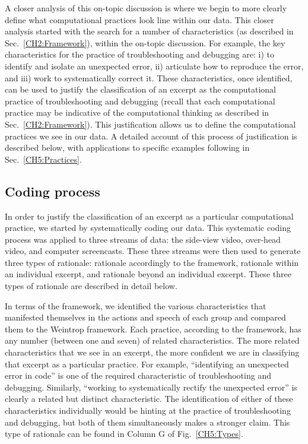 \documentclass{msuphddissertation}
\begin{document}
\begin{doublespace}
A closer analysis of this on-topic discussion is where we begin to more clearly define what computational practices look line within our data.  This closer analysis started with the search for a number of characteristics (as described in Sec.~\ref{CH2:Framework}), within the on-topic discussion.  For example, the key characteristics for the practice of troubleshooting and debugging are: i) to identify and isolate an unexpected error, ii) articulate how to reproduce the error, and iii) work to systematically correct it.  These characteristics, once identified, can be used to justify the classification of an excerpt as the computational practice of troubleshooting and debugging (recall that each computational practice may be indicative of the computational thinking as described in Sec.~\ref{CH2:Framework}).  This justification allows us to define the computational practices we see in our data.  A detailed account of this process of justification is described below, with applications to specific examples following in Sec.~\ref{CH5:Practices}.

\subsection{Coding process}\label{CH5:CodingProcess}

In order to justify the classification of an excerpt as a particular computational practice, we started by systematically coding our data.  This systematic coding process was applied to three streams of data: the side-view video, over-head video, and computer screencasts.  These three streams were then used to generate three types of rationale: rationale accordingly to the framework, rationale within an individual excerpt, and rationale beyond an individual excerpt.  These three types of rationale are described in detail below.

In terms of the framework, we identified the various characteristics that manifested themselves in the actions and speech of each group and compared them to the Weintrop framework.  Each practice, according to the framework, has any number (between one and seven) of related characteristics.  The more related characteristics that we see in an excerpt, the more confident we are in classifying that excerpt as a particular practice.  For example, ``identifying an unexpected error in code'' is one of the required characteristic of troubleshooting and debugging.  Similarly, ``working to systematically rectify the unexpected error'' is clearly a related but distinct characteristic.  The identification of either of these characteristics individually would be hinting at the practice of troubleshooting and debugging, but both of them simultaneously makes a stronger claim.  This type of rationale can be found in Column G of Fig.~\ref{CH5:Types}.


\end{doublespace}
\end{document}
